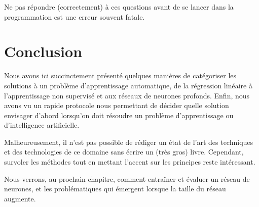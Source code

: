 Ne pas répondre (correctement) à ces questions avant de se lancer dans la programmation est une erreur souvent fatale.

\section{Conclusion}
Nous avons ici succinctement présenté quelques manières de catégoriser les solutions à un problème d'apprentissage automatique, de la régression linéaire à l'apprentissage non supervisé et aux réseaux de neurones profonds. Enfin, nous avons vu un rapide protocole nous permettant de décider quelle solution envisager d'abord lorsqu'on doit résoudre un problème d'apprentissage ou d'intelligence artificielle.

Malheureusement, il n'est pas possible de rédiger un état de l'art des techniques et des technologies de ce domaine sans écrire un (très gros) livre. Cependant, survoler les méthodes tout en mettant l'accent sur les principes reste intéressant.

Nous verrons, au prochain chapitre, comment entraîner et évaluer un réseau de neurones, et les problématiques qui émergent lorsque la taille du réseau augmente.